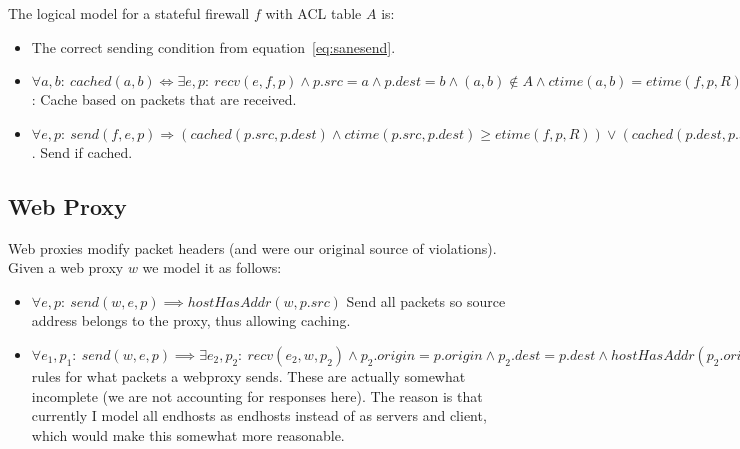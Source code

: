 {The logical model for a stateful firewall $f$ with ACL table $A$ is:

\begin{itemize}
\item The correct sending condition from equation~\ref{eq:sanesend}.
\item $\forall a, b:\ cached(a, b) \iff \exists e, p:\ recv(e, f, p) \land p.src = a \land p.dest = b\land (a, b) \not
    \in A \land ctime(a, b) = etime(f, p, R)$: Cache based on packets that are received.
\item $\forall e, p:\ send(f, e, p) \Rightarrow (cached(p.src, p.dest) \land ctime(p.src, p.dest) \geq etime(f, p, R))
    \lor (cached(p.dest, p.src) \land ctime(p.dest, p.src) \geq etime(f, p, R))$. Send if cached.
\end{itemize}

\subsection{Web Proxy}
Web proxies modify packet headers (and were our original source of violations). Given a web proxy $w$ we model it as
follows:
\begin{itemize}
\item $\forall e, p:\ send(w, e, p) \implies hostHasAddr(w, p.src)$ Send all packets so source address belongs to the
proxy, thus allowing caching.
\item $\forall e_1, p_1:\ send(w, e, p) \implies \exists e_2, p_2:\ recv(e_2, w, p_2) \land p_2.origin = p.origin \land
p_2.dest = p.dest \land hostHasAddr(p_2.origin, p_2.src) \land etime(w, p_1, S) \geq etime(w, p_1, R)$ rules for what
packets a webproxy sends. These are actually somewhat incomplete (we are not accounting for responses here). The
reason is that currently I model all endhosts as endhosts instead of as servers and client, which would make this
somewhat more reasonable.
\end{itemize}
}
